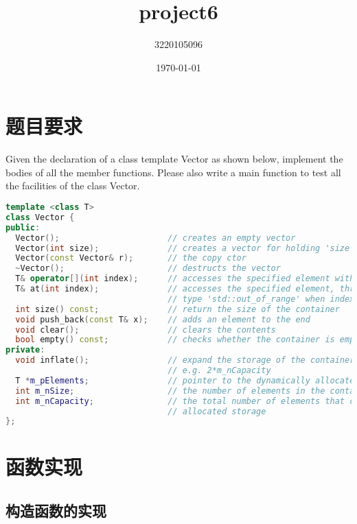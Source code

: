 \documentclass{ctexart} %
\title{project6}
\author{3220105096}
\date{\today}
\begin{document}
\maketitle %

\section{题目要求}

Given the declaration of a class template Vector as shown below, implement the bodies of all the member functions. Please also write a main function to test all the facilities of the class Vector.
\begin{lstlisting}[language = c++, caption = Vector]
template <class T>
class Vector {
public:
  Vector();                      // creates an empty vector
  Vector(int size);              // creates a vector for holding 'size' elements
  Vector(const Vector& r);       // the copy ctor
  ~Vector();                     // destructs the vector 
  T& operator[](int index);      // accesses the specified element without bounds checking
  T& at(int index);              // accesses the specified element, throws an exception of
                                 // type 'std::out_of_range' when index <0 or >=m_nSize
  int size() const;              // return the size of the container
  void push_back(const T& x);    // adds an element to the end 
  void clear();                  // clears the contents
  bool empty() const;            // checks whether the container is empty 
private:
  void inflate();                // expand the storage of the container to a new capacity,
                                 // e.g. 2*m_nCapacity
  T *m_pElements;                // pointer to the dynamically allocated storage
  int m_nSize;                   // the number of elements in the container
  int m_nCapacity;               // the total number of elements that can be held in the
                                 // allocated storage
};
\end{lstlisting}

\section{函数实现}
\subsection{构造函数的实现}
\end{document}
